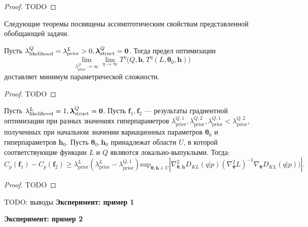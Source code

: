 \begin{proof}
TODO
\end{proof}


Следующие теоремы посвящены ассимптотическим свойствам представленной обобщающей задачи.
\begin{theorem}
Пусть ${\lambda_{\text{likelihood}}^Q}= {\lambda_{\text{prior}}^L}>0, {\boldsymbol{\lambda}^Q_{\text{struct}} }= \bf{0}$.
Тогда предел оптимизации
\[
\lim_{{\lambda^Q_\text{prior}} \to \infty} \lim_{\eta \to \infty}   T^\eta\bigl(Q, \mathbf{h}, T^\eta(L, \boldsymbol{\theta}_0, \mathbf{h})\bigr)
\]  
доставляет минимум параметрической сложности. 
\end{theorem}
\begin{proof}
TODO
\end{proof}

\begin{theorem}
Пусть ${\lambda^L_{\text{likelihood}}} = 1 ,{\boldsymbol{\lambda}^Q_{\text{struct}}} = \bf 0$.
Пусть  $\mathbf{f}_1, \mathbf{f}_2$ --- результаты градиентной оптимизации при разных значениях гиперпараметров ${\lambda_{\text{prior}}^{Q,1},\lambda_{\text{prior}}^{Q,2}, \lambda_{\text{prior}}^{Q,1}<\lambda_{\text{prior}}^{Q,2}}$, полученных при начальном значении вариационных параметров $\boldsymbol{\theta}_0$ и гиперпараметров $\mathbf{h}_0$.
Пусть $\boldsymbol{\theta}_0, \mathbf{h}_0$ принадлежат области  $U$, в которой соответствующие функции $L$ и $Q$ являются локально-выпуклыми.
Тогда:
\[
    C_p(\mathbf{f}_1)-C_p(\mathbf{f}_2)  \geq {\lambda_\text{prior}^L(\lambda_\text{prior}^L-\lambda_\text{prior}^{Q,1})}\text{sup}_{\boldsymbol{\theta}, \mathbf{h} \in U}|\nabla^2_{\boldsymbol{\theta}, \mathbf{h}} {D_{KL}(q|p)} (\nabla^2_{\boldsymbol{\theta}} L)^{-1}   \nabla_{\boldsymbol{\theta}} {D_{KL}(q|p))}|.
\]
\end{theorem}
\begin{proof}
TODO
\end{proof}
TODO: выводы
\textbf{Эксперимент: пример 1}

\textbf{Эксперимент: пример 2}







